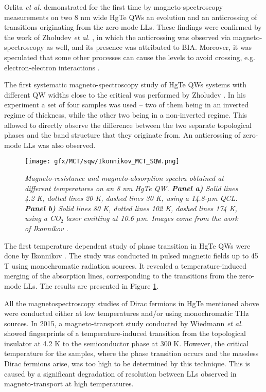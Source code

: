 \documentclass[titlepage,a4paper]{book}
\begin{document}
Orlita \textit{et al.} \cite{Orlita_MCT_QW} demonstrated for the first time by magneto-spectroscopy measurements on two 8 nm wide HgTe QWs an evolution and an anticrossing of transitions originating from the zero-mode LLs. These findings were confirmed by the work of Zholudev \textit{et al.} \cite{Zholudev_MCT_QW_anticrossing}, in which the anticrossing was observed via magneto-spectroscopy as well, and its presence was attributed to BIA. Moreover, it was speculated that some other processes can cause the levels to avoid crossing, e.g. electron-electron interactions \cite{Orlita_MCT_QW}.

The first systematic magneto-spectroscopy study of HgTe QWs systems with different QW widths close to the critical was performed by Zholudev \cite{Zholudev_MCT_QW}. In his experiment a set of four samples was used -- two of them being in an inverted regime of thickness, while the other two being in a non-inverted regime. This allowed to directly observe the difference between the two separate topological phases and the band structure that they originate from. An anticrossing of zero-mode LLs was also observed.
\begin{figure}[ht]
	\centering
	\texttt{[image: gfx/MCT/sqw/Ikonnikov\_MCT\_SQW.png]}
	\vspace{-10pt}
	\caption{\textit{Magneto-resistance and magneto-absorption spectra obtained at different temperatures on an 8 nm HgTe QW. \textbf{Panel a)} Solid lines 4.2 K, dotted lines 20 K, dashed lines 30 K, using a 14.8-$\mu$m QCL. \textbf{Panel b)} Solid lines 80 K, dotted lines 102 K, dashed lines 174 K, using a CO$_2$ laser emitting at 10.6 $\mu$m. Images come from the work of Ikonnikov \cite{Ikonnikov_MCT_SQW}.}}
	\label{fig:Ikonnikov_MCT_SQW}
\end{figure}

The first temperature dependent study of phase transition in HgTe QWs were done by Ikonnikov \cite{Ikonnikov_MCT_SQW}. The study was conducted in pulsed magnetic fields up to 45 T using monochromatic radiation sources. It revealed a temperature-induced merging of the absorption lines, corresponding to the transitions from the zero-mode LLs. The results are presented in Figure \ref{fig:Ikonnikov_MCT_SQW}.

All the magnetospectroscopy studies of Dirac fermions in HgTe mentioned above were conducted either at low temperatures and/or using monochromatic THz sources. In 2015, a magneto-transport study conducted by Wiedmann \textit{et al.} \cite{Wiedmann_State} showed fingerprints of a temperature-induced transition from the topological insulator at 4.2 K to the semiconductor phase at 300 K. However, the critical temperature for the samples, where the phase transition occurs and the massless Dirac fermions arise, was too high to be determined by this technique. This is caused by a significant degradation of resolution between LLs observed in magneto-transport at high temperatures.
\end{document}
